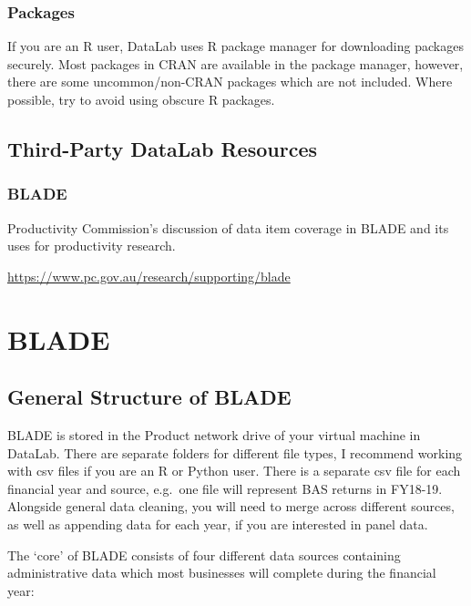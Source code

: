 \documentclass[
]{book}
\begin{document}
\hypertarget{packages}{%
\subsection{Packages}\label{packages}}

If you are an R user, DataLab uses R package manager for downloading packages securely. Most packages in CRAN are available in the package manager, however, there are some uncommon/non-CRAN packages which are not included. Where possible, try to avoid using obscure R packages.

\hypertarget{third-party-datalab-resources}{%
\section{Third-Party DataLab Resources}\label{third-party-datalab-resources}}

\hypertarget{blade}{%
\subsection{BLADE}\label{blade}}

Productivity Commission's discussion of data item coverage in BLADE and its uses for productivity research.

\url{https://www.pc.gov.au/research/supporting/blade}

\hypertarget{BLADE}{%
\chapter{BLADE}\label{BLADE}}

\hypertarget{general-structure-of-blade}{%
\section{General Structure of BLADE}\label{general-structure-of-blade}}

BLADE is stored in the Product network drive of your virtual machine in DataLab. There are separate folders for different file types, I recommend working with csv files if you are an R or Python user. There is a separate csv file for each financial year and source, e.g.~one file will represent BAS returns in FY18-19. Alongside general data cleaning, you will need to merge across different sources, as well as appending data for each year, if you are interested in panel data.

The `core' of BLADE consists of four different data sources containing administrative data which most businesses will complete during the financial year:
\end{document}
